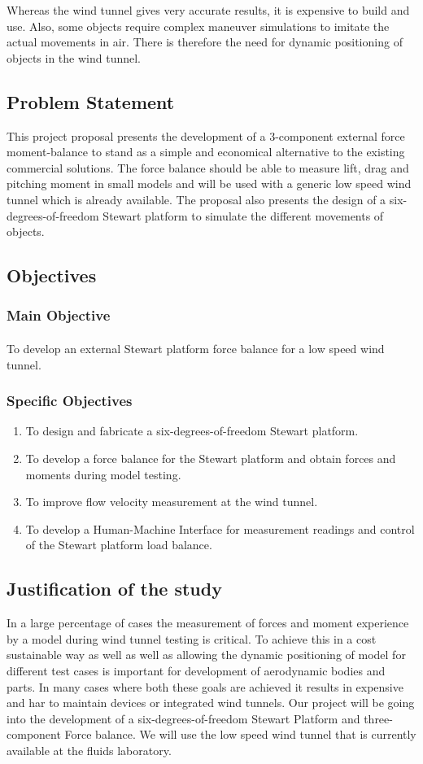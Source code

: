 Whereas the wind tunnel gives very accurate results, it is expensive to build and use. Also, some objects require complex maneuver simulations to imitate the actual movements in air. There is therefore the need for dynamic positioning of objects in the wind tunnel.

\subsection{Problem Statement}This project proposal presents the development of a 3-component external force moment-balance to stand as a simple and economical alternative to the existing commercial solutions. The force balance should be able to measure lift, drag and pitching moment in small models and will be used with a generic low speed wind tunnel which is already available. The proposal also presents the design of a six-degrees-of-freedom Stewart platform to simulate the different movements of objects.
\subsection{Objectives}
\subsubsection{Main Objective}
\paragraph{} To develop an external Stewart platform force balance for a low speed wind tunnel. 
\subsubsection{Specific Objectives}
\begin{enumerate}
\item To design and fabricate a six-degrees-of-freedom Stewart platform.
\item To develop a force balance for the Stewart platform and obtain forces and moments during model testing.
\item To improve flow velocity measurement at the wind tunnel.
\item To develop a Human-Machine Interface for measurement readings and control of the Stewart platform load balance.
\end{enumerate}
\subsection{Justification of the study}
In a large percentage of cases the measurement of forces and moment experience by a model during wind tunnel testing is critical. To achieve this in a cost sustainable way as well as well as allowing the dynamic positioning of model for different test cases is important for development of aerodynamic bodies and parts. In many cases where both these goals are achieved it results in expensive and har to maintain devices or integrated wind tunnels. Our project will be going into the development of a six-degrees-of-freedom Stewart Platform and three-component Force balance. We will use the low speed wind tunnel that is currently available at the fluids laboratory.
